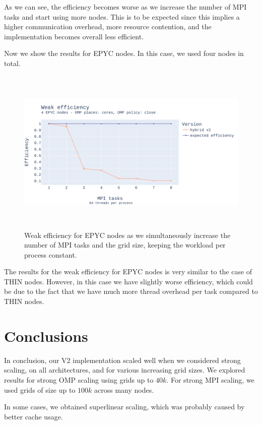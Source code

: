 \documentclass{report}
\begin{document}
As we can see, the efficiency becomes worse as we increase the number of MPI 
tasks and start using more nodes. This is to be expected since this implies a 
higher communication overhead, more resource contention, and the implementation 
becomes overall less efficient.

Now we show the results for EPYC nodes. In this case, we used four nodes in total.

\begin{figure}[H]
\centering
\includegraphics[width=14cm, height=8cm]{./images/weak_MPI_epyc_hybrid.pdf}
\caption{\label{fig:weakmpiepychybrid} Weak efficiency for EPYC nodes as 
we simultaneously increase the number of MPI tasks and the grid size, keeping the 
workload per process constant.}
\end{figure}

The results for the weak efficiency for EPYC nodes is very similar to the case 
of THIN nodes. However, in this case we have slightly worse efficiency, which 
could be due to the fact that we have much more thread overhead per task compared 
to THIN nodes.

\section{Conclusions}

In conclusion, our V2 implementation scaled well when we considered strong scaling, 
on all architectures, and for various increasing grid sizes. We explored results for 
strong OMP scaling using grids up to $40k$. For strong MPI scaling, we used 
grids of size up to $100k$ across many nodes.  

In some cases, we obtained superlinear scaling, which was probably caused by better 
cache usage. 
\end{document}
